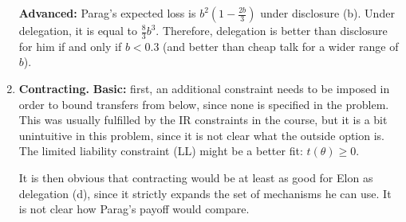 \documentclass[a4paper]{article}
\begin{document}
\begin{enumerate}[label={(\alph{enumi})}]
	\textbf{Advanced:} Parag's expected loss is $b^2\left( 1-\frac{2b}{3} \right)$ under disclosure (b). Under delegation, it is equal to $\frac{8}{3}b^3$. Therefore, delegation is better than disclosure for him if and only if $b < 0.3$ (and better than cheap talk for a wider range of $b$).
	
	
	\item \textbf{Contracting.}
	\textbf{Basic:}	first, an additional constraint needs to be imposed in order to bound transfers from below, since none is specified in the problem. This was usually fulfilled by the IR constraints in the course, but it is a bit unintuitive in this problem, since it is not clear what the outside option is. The limited liability constraint (LL) might be a better fit: $t(\theta) \geq 0$.
	
	It is then obvious that contracting would be at least as good for Elon as delegation (d), since it strictly expands the set of mechanisms he can use. It is not clear how Parag's payoff would compare.
	

\end{enumerate}
\end{document}
